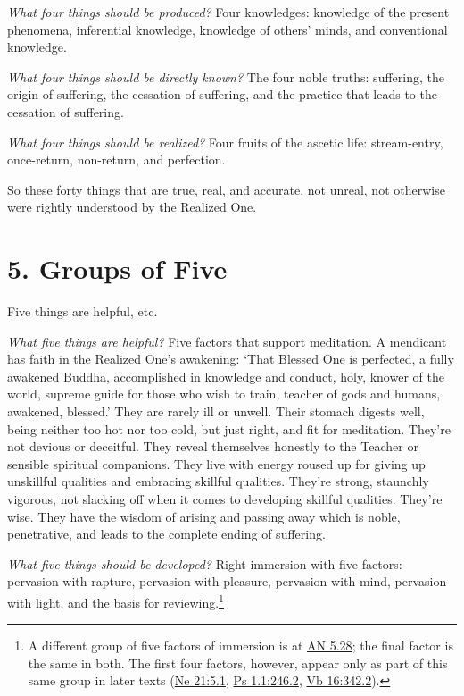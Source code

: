 \documentclass[12pt,openany]{book}%
\begin{document}
\emph{What four things should be produced?} Four knowledges: knowledge of the present phenomena, inferential knowledge, knowledge of others’ minds, and conventional knowledge. 

\emph{What four things should be directly known?} The four noble truths: suffering, the origin of suffering, the cessation of suffering, and the practice that leads to the cessation of suffering. 

\emph{What four things should be realized?} Four fruits of the ascetic life: stream-entry, once-return, non-return, and perfection. 

So these forty things that are true, real, and accurate, not unreal, not otherwise were rightly understood by the Realized One. 

\section*{5. Groups of Five }

Five things are helpful, etc. 

\emph{What five things are helpful?} Five factors that support meditation. A mendicant has faith in the Realized One’s awakening: ‘That Blessed One is perfected, a fully awakened Buddha, accomplished in knowledge and conduct, holy, knower of the world, supreme guide for those who wish to train, teacher of gods and humans, awakened, blessed.’ They are rarely ill or unwell. Their stomach digests well, being neither too hot nor too cold, but just right, and fit for meditation. They’re not devious or deceitful. They reveal themselves honestly to the Teacher or sensible spiritual companions. They live with energy roused up for giving up unskillful qualities and embracing skillful qualities. They’re strong, staunchly vigorous, not slacking off when it comes to developing skillful qualities. They’re wise. They have the wisdom of arising and passing away which is noble, penetrative, and leads to the complete ending of suffering. 

\emph{What five things should be developed?} Right immersion with five factors: pervasion with rapture, pervasion with pleasure, pervasion with mind, pervasion with light, and the basis for reviewing.\footnote{A different group of five factors of immersion is at \href{https://suttacentral.net/an5.28/en/sujato}{AN 5.28}; the final factor is the same in both. The first four factors, however, appear only as part of this same group in later texts (\href{https://suttacentral.net/ne21/en/sujato\#5.1}{Ne 21:5.1}, \href{https://suttacentral.net/ps1.1/en/sujato\#246.2}{Ps 1.1:246.2}, \href{https://suttacentral.net/vb16/en/sujato\#342.2}{Vb 16:342.2}). } 
\end{document}
